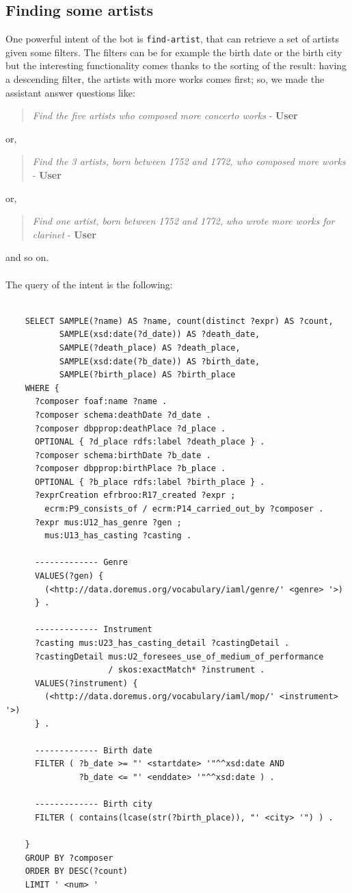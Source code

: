 \documentclass[a4paper,12pt]{report}
\begin{document}
	\subsection{Finding some artists}
	One powerful intent of the bot is \texttt{find-artist}, that can retrieve a set of artists given some filters. The filters can be for example the birth date or the birth city but the interesting functionality comes thanks to the sorting of the result: having a descending filter, the artists with more works comes first; so, we made the assistant answer questions like:
	\begin{verse}
	\textit{Find the five artists who composed more concerto works} - \textbf{User}\\
	\end{verse}
	or,
	\begin{verse}
	\textit{Find the 3 artists, born between 1752 and 1772, who composed more works} - \textbf{User}\\
	\end{verse}
	or,
	\begin{verse}
	\textit{Find one artist, born between 1752 and 1772, who wrote more works for clarinet} - \textbf{User}\\
	\end{verse}
	and so on.\\\\
	The query of the intent is the following:
	\begin{lstlisting}
	
	SELECT SAMPLE(?name) AS ?name, count(distinct ?expr) AS ?count,
	       SAMPLE(xsd:date(?d_date)) AS ?death_date,
	       SAMPLE(?death_place) AS ?death_place,
	       SAMPLE(xsd:date(?b_date)) AS ?birth_date,
	       SAMPLE(?birth_place) AS ?birth_place
	WHERE {
	  ?composer foaf:name ?name .
	  ?composer schema:deathDate ?d_date .
	  ?composer dbpprop:deathPlace ?d_place .
	  OPTIONAL { ?d_place rdfs:label ?death_place } .
	  ?composer schema:birthDate ?b_date .
	  ?composer dbpprop:birthPlace ?b_place .
	  OPTIONAL { ?b_place rdfs:label ?birth_place } .
	  ?exprCreation efrbroo:R17_created ?expr ;
	    ecrm:P9_consists_of / ecrm:P14_carried_out_by ?composer .
	  ?expr mus:U12_has_genre ?gen ;
	    mus:U13_has_casting ?casting .
	
	  ------------- Genre
	  VALUES(?gen) {
	    (<http://data.doremus.org/vocabulary/iaml/genre/' <genre> '>)
	  } .
		
	  ------------- Instrument
	  ?casting mus:U23_has_casting_detail ?castingDetail .
	  ?castingDetail mus:U2_foresees_use_of_medium_of_performance
	                 / skos:exactMatch* ?instrument .
	  VALUES(?instrument) {
	    (<http://data.doremus.org/vocabulary/iaml/mop/' <instrument> '>)
	  } .
		
	  ------------- Birth date
	  FILTER ( ?b_date >= "' <startdate> '"^^xsd:date AND
	           ?b_date <= "' <enddate> '"^^xsd:date ) .
		
	  ------------- Birth city
	  FILTER ( contains(lcase(str(?birth_place)), "' <city> '") ) .
		
	}
	GROUP BY ?composer
	ORDER BY DESC(?count)
	LIMIT ' <num> '
	\end{lstlisting}
	
\end{document}
